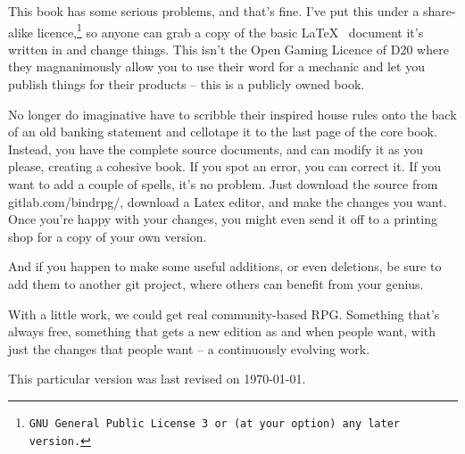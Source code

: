 \begin{multicols}{2}

This book has some serious problems, and that's fine.  I've put this under a share-alike licence,\footnote{\tt GNU General Public License 3 or (at your option) any later version.} so anyone can grab a copy of the basic \LaTeX~ document it's written in and change things.  This isn't the Open Gaming Licence of D20 where they magnanimously allow you to use their word for a mechanic and let you publish things for their products -- this is a publicly owned book.

No longer do imaginative  have to scribble their inspired house rules onto the back of an old banking statement and cellotape it to the last page of the core book.
Instead, you have the complete source documents, and can modify it as you please, creating a cohesive book.
If you spot an error, you can correct it.
If you want to add a couple of spells, it's no problem.
Just download the source from gitlab.com/bindrpg/, download a Latex editor, and make the changes you want.
Once you're happy with your changes, you might even send it off to a printing shop for a copy of your own version.

And if you happen to make some useful additions, or even deletions, be sure to add them to another git project, where others can benefit from your genius.

With a little work, we could get real community-based RPG.  Something that's always free, something that gets a new edition as and when people want, with just the changes that people want -- a continuously evolving work.

This particular version was last revised on \today.

\end{multicols}

